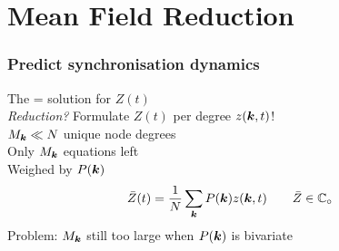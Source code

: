 \section{\theory Mean Field Reduction}
\begin{frame}
\frametitle{Predict synchronisation dynamics} 
The \MFR = solution for $Z(t)$\\ [0.5cm]

\textsl{Reduction?} Formulate $Z(t)$ per degree $z({\boldsymbol{k}},t)$!\\
\tabitem $M_{{\boldsymbol{k}}} \ll N$ unique node degrees \\
\tabitem Only $M_{{\boldsymbol{k}}}$ equations left \\
\tabitem Weighed by $P({\boldsymbol{k}})$ 
\begin{align*}
\bar{Z}(t) &= \frac{1}{N} \sum_{{\boldsymbol{k}}} P({\boldsymbol{k}}) z({\boldsymbol{k}}, t) \qquad \bar{Z} \in \mathbb{C}_\circ \label{eq:OttAntonsenMeanField}
\end{align*}
Problem: $M_{{\boldsymbol{k}}}$ still too large when $P({\boldsymbol{k}})$ is bivariate
\end{frame}

